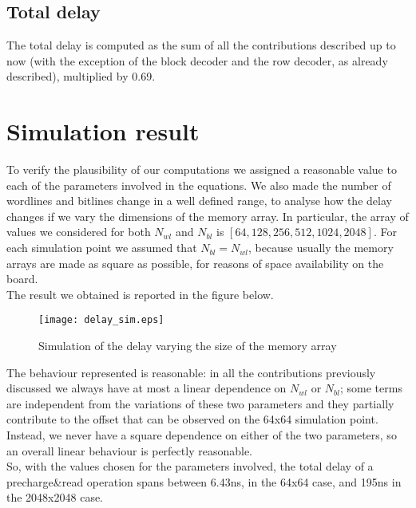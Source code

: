 \subsection{Total delay}
The total delay is computed as the sum of all the contributions described up to now (with the exception of the block decoder and the row decoder, as already described), multiplied by 0.69.

\section{Simulation result}
To verify the plausibility of our computations we assigned a reasonable value to each of the parameters involved in the equations. We also made the number of wordlines and bitlines change in a well defined range, to analyse how the delay changes if we vary the dimensions of the memory array. In particular, the array of values we considered for both $N_{wl}$ and $N_{bl}$ is $[64, 128, 256, 512, 1024, 2048]$. For each simulation point we assumed that $N_{bl}=N_{wl}$, because usually the memory arrays are made as square as possible, for reasons of space availability on the board.\\

The result we obtained is reported in the figure below. 

\begin{figure}[h] 
	\begin{center}
		\texttt{[image: delay\_sim.eps]}
	\end{center}
	\caption{Simulation of the delay varying the size of the memory array} 
\end{figure}

The behaviour represented is reasonable: in all the contributions previously discussed we always have at most a linear dependence on $N_{wl}$ or $N_{bl}$; some terms are independent from the variations of these two parameters and they partially contribute to the offset that can be observed on the 64x64 simulation point. Instead, we never have a square dependence on either of the two parameters, so an overall linear behaviour is perfectly reasonable.\\

So, with the values chosen for the parameters involved, the total delay of a precharge\&read operation spans between 6.43ns, in the 64x64 case, and 195ns in the 2048x2048 case.